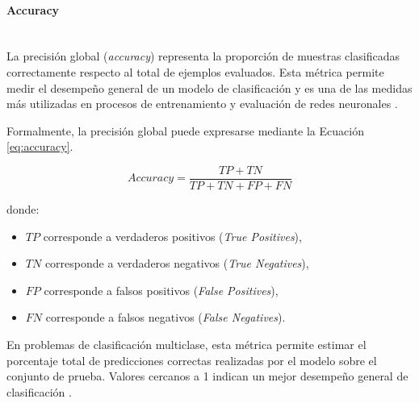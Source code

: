 	
	\paragraph{Accuracy}\mbox{}\\
	
	La precisión global (\textit{accuracy}) representa la proporción de muestras clasificadas correctamente respecto al total de ejemplos evaluados. Esta métrica permite medir el desempeño general de un modelo de clasificación y es una de las medidas más utilizadas en procesos de entrenamiento y evaluación de redes neuronales \cite{goodfellow2016deep,geron2022hands}.
	
	Formalmente, la precisión global puede expresarse mediante la Ecuación \ref{eq:accuracy}.
	
	\begin{equation}
		\label{eq:accuracy}
		Accuracy = \frac{TP + TN}{TP + TN + FP + FN}
	\end{equation}
	
	donde:
	\begin{itemize}
		\item $TP$ corresponde a verdaderos positivos (\textit{True Positives}),
		\item $TN$ corresponde a verdaderos negativos (\textit{True Negatives}),
		\item $FP$ corresponde a falsos positivos (\textit{False Positives}),
		\item $FN$ corresponde a falsos negativos (\textit{False Negatives}).
	\end{itemize}
	
	En problemas de clasificación multiclase, esta métrica permite estimar el porcentaje total de predicciones correctas realizadas por el modelo sobre el conjunto de prueba. Valores cercanos a 1 indican un mejor desempeño general de clasificación \cite{chollet2021deep}.
	
	
	
	
